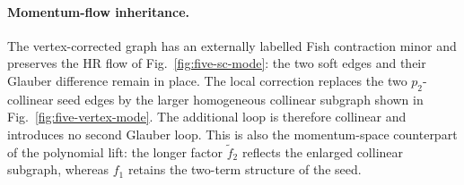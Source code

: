 \documentclass[a4paper,11pt]{article}
\begin{document}
\paragraph{Momentum-flow inheritance.}\par\smallskip
The vertex-corrected graph has an externally labelled Fish contraction minor
and preserves the HR flow of Fig.~\ref{fig:five-sc-mode}: the two soft edges
and their Glauber difference remain in place.  The local
correction replaces the two \(p_2\)-collinear seed edges by the larger
homogeneous collinear subgraph shown in
Fig.~\ref{fig:five-vertex-mode}.  The additional loop is therefore
collinear and introduces no second Glauber loop.  This is also the
momentum-space counterpart of the polynomial lift: the longer factor \(\widetilde f_2\)
reflects the enlarged collinear subgraph, whereas \(f_1\) retains the
two-term structure of the seed.
\end{document}
